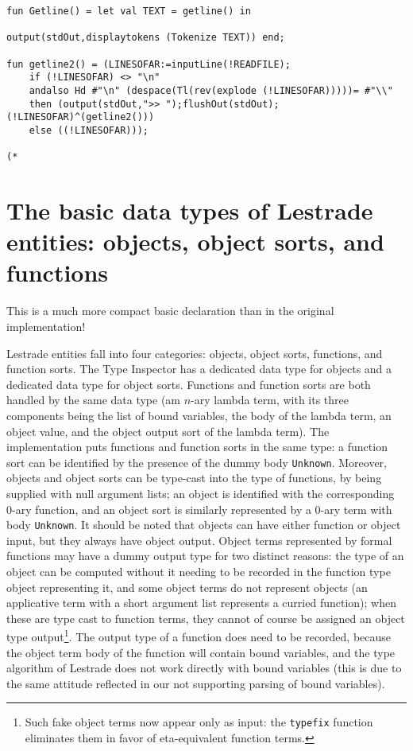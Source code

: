 \documentclass[12pt]{article}
\begin{document}
\begin{verbatim}
fun Getline() = let val TEXT = getline() in

output(stdOut,displaytokens (Tokenize TEXT)) end;

fun getline2() = (LINESOFAR:=inputLine(!READFILE);
    if (!LINESOFAR) <> "\n"
	andalso Hd #"\n" (despace(Tl(rev(explode (!LINESOFAR)))))= #"\\"
	then (output(stdOut,">> ");flushOut(stdOut);(!LINESOFAR)^(getline2()))
	else ((!LINESOFAR)));

(*

\end{verbatim}

\newpage

\section{The basic data types of Lestrade entities:   objects, object sorts, and functions}

This is a much more compact basic declaration than in the original implementation!

Lestrade entities fall into four categories:  objects, object sorts, functions, and function sorts.  The Type Inspector has a dedicated data type for objects and a dedicated data type for object sorts.
Functions and function sorts are both handled by the same data type (am $n$-ary lambda term, with its three components being the list of bound variables, the body of the lambda term, an object value, and the object output sort of the lambda term).  The implementation puts functions and function sorts in the same type:  a function sort can be identified by the presence of the dummy body
{\tt Unknown}.  Moreover, objects and object sorts can be type-cast into the type of functions, by being supplied with null argument lists;  an object is identified with the corresponding 0-ary function, and an object sort is similarly represented by a 0-ary term with body {\tt Unknown}.  It should be noted that objects can have either function or object input, but they always have
object output.  Object terms represented by formal functions may have a dummy output type for two distinct reasons:  the type of an object can be computed without it needing
to be recorded in the function type object representing it, and some object terms do not represent objects (an applicative term with a short argument list represents a curried function);
when these are type cast to function terms, they cannot of course be assigned an object type output\footnote{Such fake object terms now appear only as input:  the {\tt typefix} function eliminates them in favor of eta-equivalent function terms.}.   The output type of a function does need to be recorded, because the object term body of the function will contain bound variables, and the type algorithm of Lestrade does not work directly with bound variables (this is due to the same attitude reflected in our not supporting parsing of bound variables).
\end{document}
